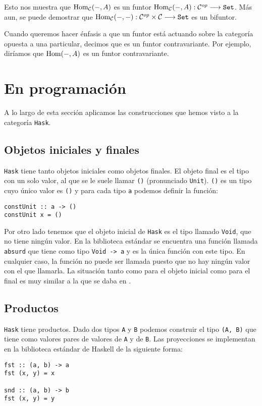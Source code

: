 Esto nos muestra que $\operatorname{Hom}_{\mathcal{C}}(-, A)$ es un funtor
$\operatorname{Hom}_{\mathcal{C}}(-, A) : \mathcal{C}^{op}\longrightarrow \texttt{Set}$. Más aun, se puede demostrar
que $\operatorname{Hom}_{\mathcal{C}}(-, -) : \mathcal{C}^{op} \times \mathcal{C}\longrightarrow \texttt{Set}$ es un bifuntor.

Cuando queremos hacer énfasis a que un funtor está actuando sobre
la categoría opuesta a una particular, decimos que es un funtor
contravariante. Por ejemplo, diríamos que $\operatorname{Hom}(-, A)$ es un funtor
contravariante.

\section{En programación}
A lo largo de esta sección aplicamos las construcciones que hemos visto
a la categoría \texttt{Hask}.

\subsection{Objetos iniciales y finales}
\texttt{Hask} tiene tanto objetos iniciales como objetos finales. El
objeto final es el tipo con un solo valor, al que se le suele llamar
\texttt{()} (pronunciado \texttt{Unit}). \texttt{()} es un tipo
cuyo único valor es \texttt{()} y para cada tipo \texttt{a} podemos
definir la función:
\begin{verbatim}
constUnit :: a -> ()
constUnit x = ()
\end{verbatim}
Por otro lado tenemos que el objeto inicial de \texttt{Hask} es el tipo
llamado \texttt{Void}, que no tiene ningún valor. En la biblioteca
estándar se encuentra una función llamada \texttt{absurd}
que tiene
como tipo \texttt{Void -> a} y es la única función con este tipo.
En cualquier caso, la función no puede ser llamada puesto que no
hay ningún valor con el que llamarla. La situación tanto como para
el objeto inicial como para el final es muy similar a la que se daba
en \Set.

\subsection{Productos}
\texttt{Hask} tiene productos. Dado dos tipos \texttt{A} y
\texttt{B} podemos construir el tipo \texttt{(A, B)} que tiene
como valores pares de valores de \texttt{A} y de \texttt{B}.
Las proyecciones se implementan en la biblioteca estándar de
Haskell de la siguiente forma:

\begin{verbatim}
fst :: (a, b) -> a
fst (x, y) = x

snd :: (a, b) -> b
fst (x, y) = y
\end{verbatim}


